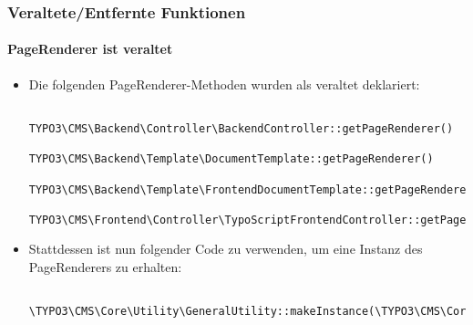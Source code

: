 \begin{frame}[fragile]
\begin{itemize}
	\end{itemize}

\end{frame}


\begin{frame}[fragile]
	\frametitle{Veraltete/Entfernte Funktionen}
	\framesubtitle{PageRenderer ist veraltet}

	\lstset{basicstyle=\tiny\ttfamily}

	\begin{itemize}
		\item Die folgenden PageRenderer-Methoden wurden als veraltet deklariert:

			\begin{lstlisting}
				TYPO3\CMS\Backend\Controller\BackendController::getPageRenderer()
				TYPO3\CMS\Backend\Template\DocumentTemplate::getPageRenderer()
				TYPO3\CMS\Backend\Template\FrontendDocumentTemplate::getPageRenderer()
				TYPO3\CMS\Frontend\Controller\TypoScriptFrontendController::getPageRenderer()
			\end{lstlisting}

		\item Stattdessen ist nun folgender Code zu verwenden, um eine Instanz des PageRenderers zu erhalten:

			\begin{lstlisting}
				\TYPO3\CMS\Core\Utility\GeneralUtility::makeInstance(\TYPO3\CMS\Core\Page\PageRenderer::class)
			\end{lstlisting}

	\end{itemize}

\end{frame}


